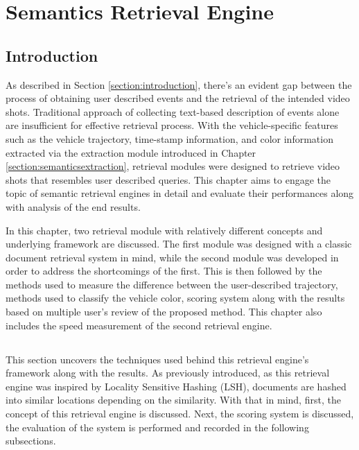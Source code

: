
\chapter{Semantics Retrieval Engine}

\label{section:retrievalengine}
\section{Introduction}

As described in Section \ref{section:introduction}, there's an evident gap between the process of obtaining user described events and the retrieval of the intended video shots. Traditional approach of collecting text-based description of events alone are insufficient for effective retrieval process.  With the vehicle-specific features such as the vehicle trajectory, time-stamp information, and color information extracted via the extraction module introduced in Chapter \ref{section:semanticsextraction}, retrieval modules were designed to retrieve video shots that resembles user described queries. This chapter aims to engage the topic of semantic retrieval engines in detail and evaluate their performances along with analysis of the end results.


In this chapter, two retrieval module with relatively different concepts and underlying framework are discussed. The first module was designed with a classic document retrieval system in mind, while the second module was developed in order to address the shortcomings of the first. This is then followed by the methods used to measure the difference between the user-described trajectory, methods used to classify the vehicle color, scoring system along with the results based on multiple user's review of the proposed method. This chapter also includes the speed measurement of the second retrieval engine.




\section{\versionOne}
This section uncovers the techniques used behind this retrieval engine's framework along with the results. As previously introduced, as this retrieval engine was inspired by Locality Sensitive Hashing (LSH), documents are hashed into similar locations depending on the similarity. With that in mind, first, the concept of this retrieval engine is discussed. Next, the scoring system is discussed, the evaluation of the system is performed and recorded in the following subsections.





